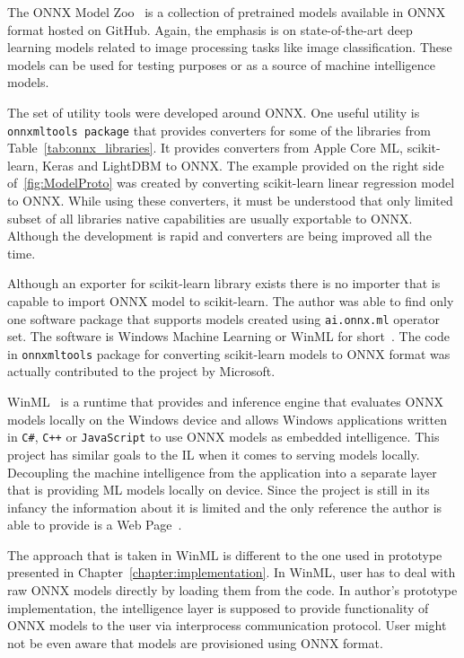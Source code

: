 \documentclass[english, 12pt, a4paper, elec, utf8, online]{aaltothesis}
\begin{document}
The ONNX Model Zoo~\cite{onnx_model_zoo} is a collection of pretrained models available in ONNX format hosted on GitHub. Again, the emphasis is on state-of-the-art deep learning models related to image processing tasks like image classification. These models can be used for testing purposes or as a source of machine intelligence models.            

The set of utility tools were developed around ONNX. One useful utility is \texttt{onnxmltools package} that provides converters for some of the libraries from Table~\ref{tab:onnx_libraries}. It provides converters from Apple Core ML, scikit-learn, Keras and LightDBM to ONNX. The example provided on the right side of~\ref{fig:ModelProto} was created by converting scikit-learn linear regression model to ONNX. While using these converters, it must be understood that only limited subset of all libraries native capabilities are usually exportable to ONNX. Although the development is rapid and converters are being improved all the time.

Although an exporter for scikit-learn library exists there is no importer that is capable to import ONNX model to scikit-learn. The author was able to find only one software package that supports models created using \texttt{ai.onnx.ml} operator set. The software is Windows Machine Learning or WinML for short~\cite{winml}. The code in \texttt{onnxmltools} package for converting scikit-learn models to ONNX format was actually contributed to the project by Microsoft. 

WinML~\cite{winml} is a runtime that provides and inference engine that evaluates ONNX models locally on the Windows device and allows Windows applications written in \texttt{C\#}, \texttt{C++} or \texttt{JavaScript} to use ONNX models as embedded intelligence. This project has similar goals to the IL when it comes to serving models locally. Decoupling the machine intelligence from the application into a separate layer that is providing ML models locally on device. Since the project is still in its infancy the information about it is limited and the only reference the author is able to provide is a Web Page~\cite{winml}.

The approach that is taken in WinML is different to the one used in prototype presented in Chapter~\ref{chapter:implementation}. In WinML, user has to deal with raw ONNX models directly by loading them from the code. In author's prototype implementation, the intelligence layer is supposed to provide functionality of ONNX models to the user via interprocess communication protocol. User might not be even aware that models are provisioned using ONNX format. 
\end{document}
